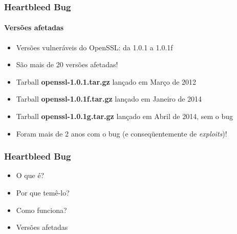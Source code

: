 \documentclass{beamer}
\begin{document}
\begin{frame}
	\frametitle{Heartbleed Bug}
	\framesubtitle{Versões afetadas}
	\begin{itemize}
		\item Versões vulneráveis do OpenSSL: da 1.0.1 a 1.0.1f
		\item São mais de 20 versões afetadas!
		\item Tarball \textbf{\textcolor{filecolor}{openssl-1.0.1.tar.gz}} lançado em Março de 2012
		\item Tarball \textbf{\textcolor{filecolor}{openssl-1.0.1f.tar.gz}} lançado em Janeiro de 2014
		\item Tarball \textbf{\textcolor{filecolor}{openssl-1.0.1g.tar.gz}} lançado em Abril de 2014, sem o bug
		\item Foram mais de 2 anos com o bug (e conseqüentemente de \textit{exploits})!
	\end{itemize}
\end{frame}

\begin{frame}
	\frametitle{Heartbleed Bug}
	\begin{itemize}
		\item \textcolor{covered}{O que é?}
		\item \textcolor{covered}{Por que temê-lo?}
		\item \textcolor{covered}{Como funciona?}
		\item \textcolor{covered}{Versões afetadas}
	\end{itemize}
\end{frame}
\end{document}
